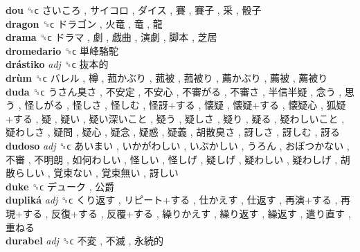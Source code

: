 \textbf{dou} ␝ϲ   さいころ ,  サイコロ ,  ダイス ,  賽 ,  賽子 ,  采 ,  骰子   \\
\textbf{dragon} ␝ϲ   ドラゴン ,  火竜 ,  竜 ,  龍   \\
\textbf{drama} ␝ϲ   ドラマ ,  劇 ,  戯曲 ,  演劇 ,  脚本 ,  芝居   \\
\textbf{dromedario} ␝ϲ   単峰駱駝   \\
\textbf{drástiko} \emph{adj}  ␝ϲ   抜本的   \\
\textbf{drùm} ␝ϲ   バレル ,  樽 ,  菰かぶり ,  菰被 ,  菰被り ,  薦かぶり ,  薦被 ,  薦被り   \\
\textbf{duda} ␝ϲ   うさん臭さ ,  不安定 ,  不安心 ,  不審がる ,  不審さ ,  半信半疑 ,  念う ,  思う ,  怪しがる ,  怪しさ ,  怪しむ ,  怪訝+する ,  懐疑 ,  懐疑+する ,  懐疑心 ,  狐疑+する ,  疑 ,  疑い ,  疑い深いこと ,  疑う ,  疑しさ ,  疑り ,  疑る ,  疑わしいこと ,  疑わしさ ,  疑問 ,  疑心 ,  疑念 ,  疑惑 ,  疑義 ,  胡散臭さ ,  訝しさ ,  訝しむ ,  訝る   \\
\textbf{dudoso} \emph{adj}  ␝ϲ   あいまい ,  いかがわしい ,  いぶかしい ,  うろん ,  おぼつかない ,  不審 ,  不明朗 ,  如何わしい ,  怪しい ,  怪しげ ,  疑しげ ,  疑わしい ,  疑わしげ ,  胡散らしい ,  覚束ない ,  覚束無い ,  訝しい   \\
\textbf{duke} ␝ϲ   デューク ,  公爵   \\
\textbf{dupliká} \emph{adj}  ␝ϲ   くり返す ,  リピート+する ,  仕かえす ,  仕返す ,  再演+する ,  再現+する ,  反復+する ,  反覆+する ,  繰りかえす ,  繰り返す ,  繰返す ,  遣り直す ,  重ねる   \\
\textbf{durabel} \emph{adj}  ␝ϲ   不変 ,  不滅 ,  永続的   \\

